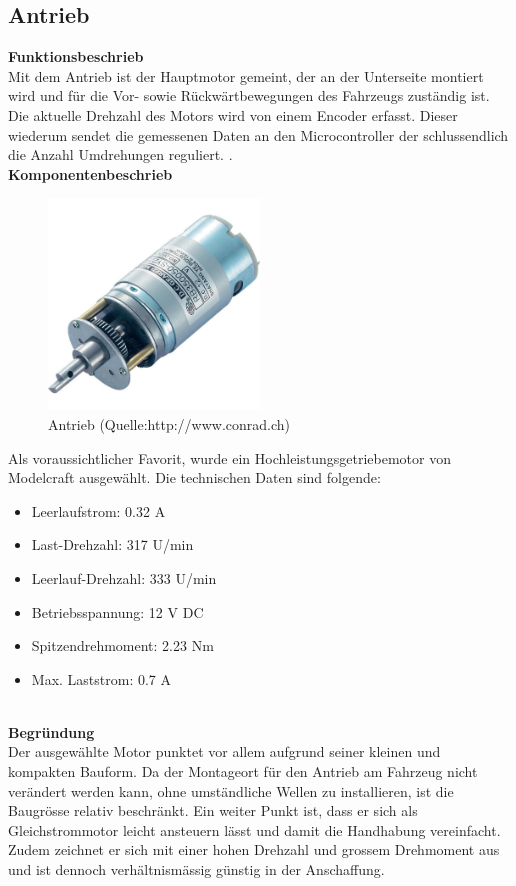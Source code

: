 \subsection{Antrieb}

\textbf{Funktionsbeschrieb}\\[0.2cm]
Mit dem Antrieb ist der Hauptmotor gemeint, der an der Unterseite montiert wird und für die Vor- sowie Rückwärtbewegungen des Fahrzeugs zuständig ist.
Die aktuelle Drehzahl des Motors wird von einem Encoder erfasst. Dieser wiederum sendet die gemessenen Daten an den Microcontroller der schlussendlich die Anzahl Umdrehungen reguliert.
.\\[0.2cm]
\textbf{Komponentenbeschrieb}
\begin{figure}[h]
\centering
\includegraphics[width=0.5\textwidth]{03_Loesungskonzept/pictures/antrieb.jpg}
\caption{Antrieb  (Quelle:http://www.conrad.ch)}	
\end{figure}
Als voraussichtlicher Favorit, wurde ein Hochleistungsgetriebemotor von Modelcraft ausgewählt. Die technischen Daten sind folgende:
\begin{itemize}
\item Leerlaufstrom: 0.32 A
\item Last-Drehzahl: 317 U/min
\item Leerlauf-Drehzahl: 333 U/min
\item Betriebsspannung: 12 V DC
\item Spitzendrehmoment: 2.23 Nm
\item Max. Laststrom: 0.7 A
\end{itemize}\\[0.2cm]
\textbf{Begründung}\\[0.2cm]
Der ausgewählte Motor punktet vor allem aufgrund seiner kleinen und kompakten Bauform. Da der Montageort für den Antrieb am Fahrzeug nicht verändert werden kann, ohne umständliche Wellen zu installieren, ist die Baugrösse relativ beschränkt.
Ein weiter Punkt ist, dass er sich als Gleichstrommotor leicht ansteuern lässt und damit die Handhabung vereinfacht.
Zudem zeichnet er sich mit einer hohen Drehzahl und grossem Drehmoment aus und ist dennoch verhältnismässig günstig in der Anschaffung.\\[0.2cm]

